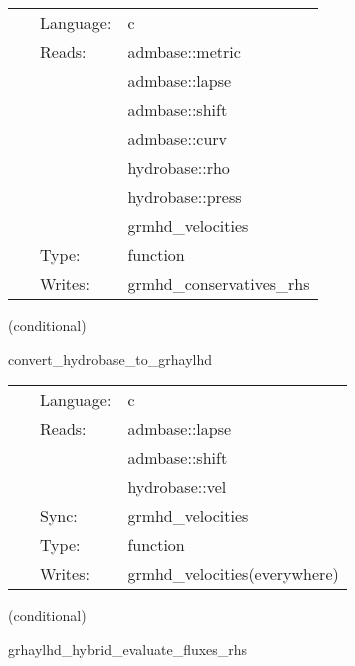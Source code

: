  \begin{tabular*}{160mm}{cll} 
~ & Language:  & c \\ 
~ & Reads:  & admbase::metric \\ 
~& ~ &admbase::lapse\\ 
~& ~ &admbase::shift\\ 
~& ~ &admbase::curv\\ 
~& ~ &hydrobase::rho\\ 
~& ~ &hydrobase::press\\ 
~& ~ &grmhd\_velocities\\ 
~ & Type:  & function \\ 
~ & Writes:  & grmhd\_conservatives\_rhs \\ 
\end{tabular*} 


\vspace{5mm}

   (conditional) 

\hspace{5mm} convert\_hydrobase\_to\_grhaylhd 

\hspace{5mm}{\it convert hydrobase initial data to grhaylhd variables } 


\hspace{5mm}

 \begin{tabular*}{160mm}{cll} 
~ & Language:  & c \\ 
~ & Reads:  & admbase::lapse \\ 
~& ~ &admbase::shift\\ 
~& ~ &hydrobase::vel\\ 
~ & Sync:  & grmhd\_velocities \\ 
~ & Type:  & function \\ 
~ & Writes:  & grmhd\_velocities(everywhere) \\ 
\end{tabular*} 


\vspace{5mm}

   (conditional) 

\hspace{5mm} grhaylhd\_hybrid\_evaluate\_fluxes\_rhs 

\hspace{5mm}{\it hybrid version of grhaylhd\_evaluate\_fluxes\_rhs } 


\hspace{5mm}

